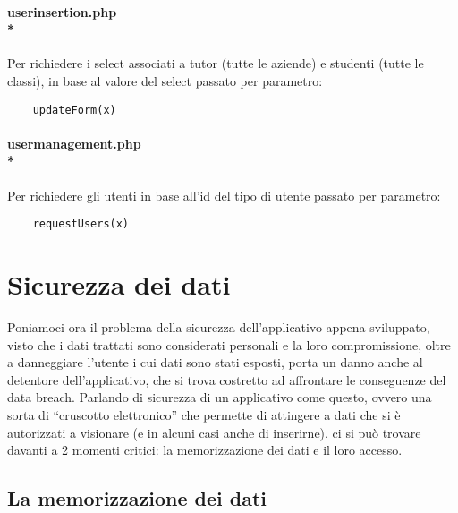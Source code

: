\documentclass[12pt]{article}
\begin{document}
\paragraph{userinsertion.php\\*}
\noindent
Per richiedere i select associati a tutor (tutte le aziende) e studenti (tutte le classi), in base al valore del select passato per parametro:
\begin{verbatim}
    updateForm(x)
\end{verbatim}

\paragraph{usermanagement.php\\*}
\noindent
Per richiedere gli utenti in base all'id del tipo di utente passato per parametro:
\begin{verbatim}
    requestUsers(x)
\end{verbatim}

\newpage
\section{Sicurezza dei dati}
Poniamoci ora il problema della sicurezza dell’applicativo appena sviluppato, visto che i dati trattati sono considerati personali e la loro compromissione, oltre a danneggiare l’utente i cui dati sono stati esposti, porta un danno anche al detentore dell’applicativo, che si trova costretto ad affrontare le conseguenze del data breach.
Parlando di sicurezza di un applicativo come questo, ovvero una sorta di “cruscotto elettronico” che permette di attingere a dati che si è autorizzati a visionare (e in alcuni casi anche di inserirne), ci si può trovare davanti a 2 momenti critici: la memorizzazione dei dati e il loro accesso.
\bigskip

\subsection{La memorizzazione dei dati}
\end{document}
